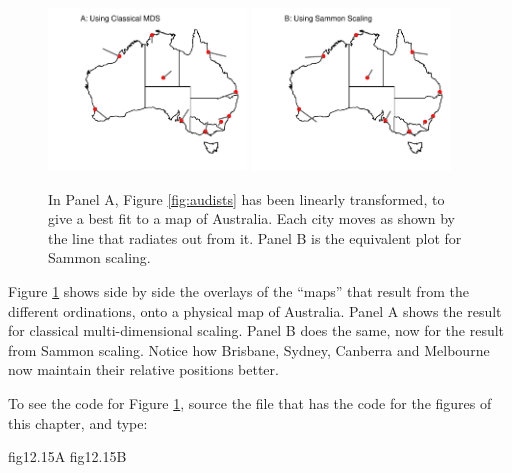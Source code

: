 \documentclass{tufte-book}\usepackage[]{graphicx}\usepackage[]{color}
\begin{document}
\begin{figure}[h]
\begin{Schunk}


\centerline{\includegraphics[width=0.47\textwidth]{figs/9-au-both-1} \includegraphics[width=0.47\textwidth]{figs/9-au-both-2} }

\end{Schunk}
      \caption{In Panel A, Figure \ref{fig:audists} has been linearly
        transformed, to give a best fit to a map of Australia.  Each city
        moves as shown by the line that radiates out from it.  Panel B
        is the equivalent plot for Sammon scaling.
\label{fig:aufit}}
 \end{figure}
 Figure \ref{fig:aufit} shows side by side the overlays of the
 ``maps'' that result from the different ordinations, onto a physical
 map of Australia.  Panel A shows the result for classical
 multi-dimensional scaling.  Panel B does the same, now for the result
 from Sammon scaling.  Notice how Brisbane, Sydney, Canberra and
 Melbourne now maintain their relative positions better.



To see the code for Figure \ref{fig:aufit}, source the file that has the
code for the figures of this chapter, and type:
\begin{Schunk}
\begin{Sinput}
fig12.15A
fig12.15B
\end{Sinput}
\end{Schunk}
\end{document}
